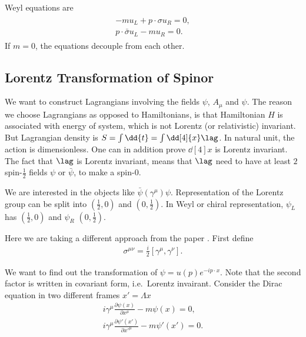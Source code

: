 Weyl equations are
\begin{align}
   \begin{split}
    -m u_L + p\cdot \sigma u_R = 0, \\
   p \cdot \bar{\sigma} u_L - m u_R = 0.
   \end{split}
\end{align}
If $m=0$, the equations decouple from each other.


\subsection{Lorentz Transformation of Spinor}
We want to construct Lagrangians involving the fields $\psi$, $A_\mu$ and $\psi$. The reason we choose Lagrangians as opposed to Hamiltonians, is that Hamiltonian $H$ is associated with energy of system, which is not Lorentz (or relativistic) invariant. But Lagrangian density is $S = \int \dd{t} = \int \dd[4]{x} \lag$. In natural unit, the action is dimensionless. One can in addition prove $\dd[4]{x}$ is Lorentz invariant.  The fact that $\lag$ is Lorentz invariant, means that $\lag$ need to have at least $2$ spin-$\frac{1}{2}$ fields $\psi$ or $\bar{\psi}$, to make a spin-$0$.

We are interested in the objects like $\bar{\psi}(\gamma^\mu) \psi$.
Representation of the Lorentz group can be split into $ \left( \frac{1}{2}, 0 \right)$ and $ \left( 0, \frac{1}{2} \right)$. In Weyl or chiral representation, $\psi_L$ has $ \left( \frac{1}{2}, 0 \right)$ and $\psi_R$ $ \left( 0, \frac{1}{2} \right)$.

Here we are taking a different approach from the paper \cite{Dreiner_2010}. First define
\begin{align}
   \sigma^{\mu\nu} = \frac{i}{2} \left[ \gamma^\mu, \gamma^\nu \right].
\end{align}

We want to find out the transformation of $\psi = u({p})e^{-ip\cdot x}$. Note that the second factor is written in covariant form, i.e.~Lorentz invairant. Consider the Dirac equation in two different frames $x' = \Lambda x$
\begin{align}
   i \gamma^\mu \frac{\partial \psi(x)}{\partial x^\mu} - m \psi(x) = 0, \label{math:dirac}\\
   i \gamma^\mu \frac{\partial \psi'(x')}{\partial x'^\mu} - m \psi'(x') = 0. \label{math:diracP}
\end{align}


